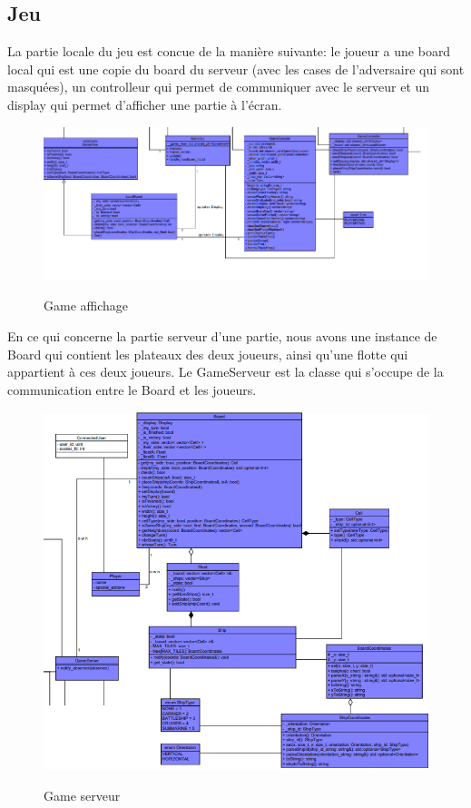 \documentclass[../design_fonctionnement_sys.tex]{subfiles}
\begin{document}
\subsection{Jeu}
La partie locale du jeu est concue de la manière suivante: 
le joueur a une board local qui est une copie du board du serveur (avec les cases de l'adversaire qui sont masquées), 
un controlleur qui permet de communiquer avec le serveur et un display qui permet d'afficher une partie à l'écran.
\begin{figure}[H]
    \centering
    \includegraphics[scale=0.6]{img_design/Game_client.png}
    \label{fig:seq_match_server}
    \caption{Game affichage}
\end{figure}

En ce qui concerne la partie serveur d'une partie, nous avons une instance de Board qui contient les plateaux des deux joueurs, 
ainsi qu'une flotte qui appartient à ces deux joueurs. Le GameServeur est la classe qui s'occupe de la communication entre le Board et les joueurs.
\begin{figure}[H]
    \centering
    \includegraphics[scale=0.6]{img_design/Game_serveur.png}
    \label{fig:seq_match_server}
    \caption{Game serveur}
\end{figure}
\end{document}
